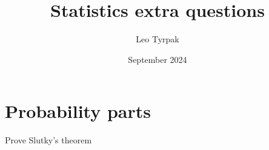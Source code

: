 \documentclass{article}
\title{Statistics extra questions}
\author{Leo Tyrpak}
\date{September 2024}
\begin{document}
\maketitle
\section{Probability parts}
Prove Slutky's theorem
\end{document}
